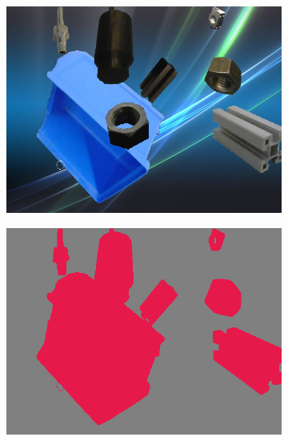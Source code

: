 \begin{figure}[h]
\begin{subfigure}{.24\textwidth}
			\includegraphics[width=1\linewidth]{images/sample_predictions/00132}
		\end{subfigure}
		\begin{subfigure}{.24\textwidth}
			\centering
			\includegraphics[width=1\linewidth]{images/sample_predictions/00132_binary_gt}
		\end{subfigure}
		\begin{subfigure}{.24\textwidth}
			\centering

\end{subfigure}
\end{figure}
